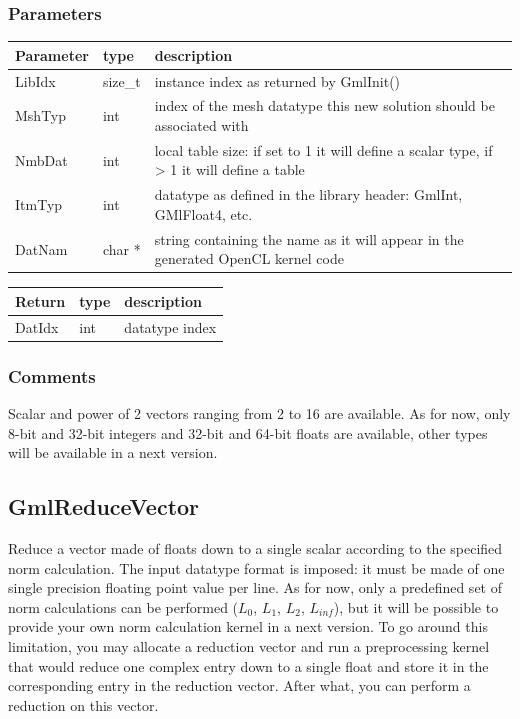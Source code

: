 \documentclass[a4paper,12pt]{article}
\begin{document}
\subsubsection*{Parameters}
\begin{tabular}{|m{2cm}|m{1.5cm}|m{10.5cm}|}
\hline
Parameter  & type    & description \\
\hline
LibIdx     & size\_t & instance index as returned by GmlInit() \\
\hline
MshTyp     & int     & index of the mesh datatype this new solution should be associated with \\
\hline
NmbDat     & int     & local table size: if set to 1 it will define a scalar type, if > 1 it will define a table \\
\hline
ItmTyp     & int     & datatype as defined in the library header: GmlInt, GMlFloat4, etc. \\
\hline
DatNam     & char *  & string containing the name as it will appear in the generated OpenCL kernel code \\
\hline
\end{tabular}

\medskip

\begin{tabular}{|m{2cm}|m{1.5cm}|m{10.5cm}|}
\hline
Return     & type   & description \\
\hline
DatIdx     & int    & datatype index \\
\hline
\end{tabular}

\subsubsection*{Comments}
Scalar and power of 2 vectors ranging from 2 to 16 are available. As for now, only 8-bit and 32-bit integers and 32-bit and 64-bit floats are available, other types will be available in a next version.


\subsection{GmlReduceVector}
Reduce a vector made of floats down to a single scalar according to the specified norm calculation. The input datatype format is imposed: it must be made of one single precision floating point value per line. As for now, only a predefined set of norm calculations can be performed ($L_0$, $L_1$, $L_2$, $L_{inf}$), but it will be possible to provide your own norm calculation kernel in a next version. To go around this limitation, you may allocate a reduction vector and run a preprocessing kernel that would reduce one complex entry down to a single float and store it in the corresponding entry in the reduction vector. After what, you can perform a reduction on this vector.
\end{document}
